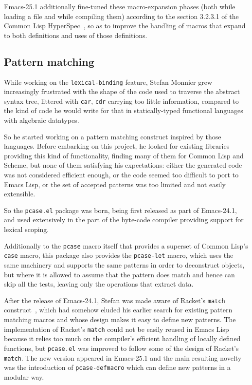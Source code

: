 \documentclass[format=acmsmall, review]{acmart}
\newcommand \Elisp {Emacs Lisp}
\begin{document}
Emacs-25.1 additionally fine-tuned these macro-expansion phases (both
while loading a file and while compiling them) according to the section
3.2.3.1 of the Common Lisp HyperSpec~\cite{HyperSpec}, so as to improve the
handling of macros that expand to both definitions and uses of
those definitions.

\subsection{Pattern matching}           %
\label{sec:pcase}

While working on the \texttt{lexical-binding} feature, Stefan Monnier grew
increasingly frustrated with the shape of the code used to traverse the
abstract syntax tree, littered with \texttt{car}, \texttt{cdr} carrying too
little information, compared to the kind of code he would write for that in
statically-typed functional languages with algebraic datatypes.

So he started working on a pattern matching construct inspired by those
languages.  Before embarking on this project, he looked for existing
libraries providing this kind of functionality, finding many of them for
Common Lisp and Scheme, but none of them satisfying his expectations: either
the generated code was not considered efficient enough, or the code seemed
too difficult to port to \Elisp{}, or the set of accepted patterns was too
limited and not easily extensible.

So the \texttt{pcase.el} package was born,
being first released as part of Emacs-24.1, and used extensively in the part
of the byte-code compiler providing support for lexical scoping.

Additionally to the \texttt{pcase} macro itself that provides a superset of
Common Lisp's \texttt{case} macro, this package also provides the
\texttt{pcase-let} macro, which uses the same machinery and supports the same
patterns in order to deconstruct objects, but where it is allowed to assume
that the pattern does match and hence can skip all the tests, leaving only the
operations that extract data.

After the release of Emacs-24.1, Stefan was made aware of Racket's
\texttt{match} construct~\cite{RacketReference2018}, which had somehow eluded
his earlier search for
existing pattern matching macros and whose design makes it easy to define
new patterns.  The implementation of Racket's \texttt{match} could not be
easily reused in \Elisp{} because it relies too much on the compiler's
efficient handling of locally defined functions, but \texttt{pcase.el} was
improved to follow some of the design of Racket's \texttt{match}.
The new version appeared in Emacs-25.1 and the main resulting novelty was the
introduction of \texttt{pcase-defmacro} which can define new patterns
in a modular way. %
\end{document}
